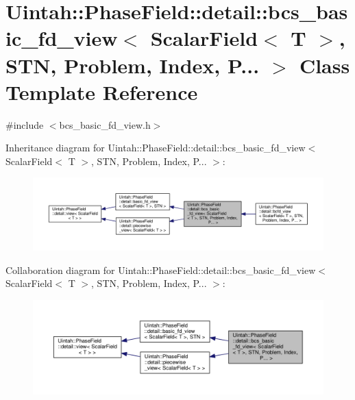 \hypertarget{classUintah_1_1PhaseField_1_1detail_1_1bcs__basic__fd__view_3_01ScalarField_3_01T_01_4_00_01STN_07caa9955adf783da0505eac75e76f08}{}\section{Uintah\+:\+:Phase\+Field\+:\+:detail\+:\+:bcs\+\_\+basic\+\_\+fd\+\_\+view$<$ Scalar\+Field$<$ T $>$, S\+TN, Problem, Index, P... $>$ Class Template Reference}
\label{classUintah_1_1PhaseField_1_1detail_1_1bcs__basic__fd__view_3_01ScalarField_3_01T_01_4_00_01STN_07caa9955adf783da0505eac75e76f08}


{\ttfamily \#include $<$bcs\+\_\+basic\+\_\+fd\+\_\+view.\+h$>$}



Inheritance diagram for Uintah\+:\+:Phase\+Field\+:\+:detail\+:\+:bcs\+\_\+basic\+\_\+fd\+\_\+view$<$ Scalar\+Field$<$ T $>$, S\+TN, Problem, Index, P... $>$\+:\nopagebreak
\begin{figure}[H]
\begin{center}
\leavevmode
\includegraphics[width=350pt]{classUintah_1_1PhaseField_1_1detail_1_1bcs__basic__fd__view_3_01ScalarField_3_01T_01_4_00_01STN_e0effd9c4e3f40d82739c913ef29ed54}
\end{center}
\end{figure}


Collaboration diagram for Uintah\+:\+:Phase\+Field\+:\+:detail\+:\+:bcs\+\_\+basic\+\_\+fd\+\_\+view$<$ Scalar\+Field$<$ T $>$, S\+TN, Problem, Index, P... $>$\+:\nopagebreak
\begin{figure}[H]
\begin{center}
\leavevmode
\includegraphics[width=350pt]{classUintah_1_1PhaseField_1_1detail_1_1bcs__basic__fd__view_3_01ScalarField_3_01T_01_4_00_01STN_479744f0941af26351070d76b488bf63}
\end{center}
\end{figure}
